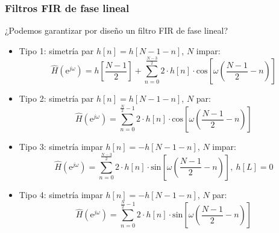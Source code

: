 \documentclass[handout]{beamer}
\numberwithin{section}{part}
\begin{document}
\begin{frame}
  \frametitle{Filtros FIR de fase lineal}
 
  \alert{¿Podemos garantizar por diseño un filtro FIR de fase lineal?}
  
  \begin{itemize}
    \footnotesize %
    \item \alert{Tipo 1}: simetría par $h[n]=h[N-1-n]$, $N$ impar:\\
    \[
    \hat H(\mathrm{e}^{j\omega})=h[\frac{N-1}{2}] + \sum_{n=0}^{\frac{N-3}{2}}2\cdot h[n]\cdot\mathrm{cos}\left[\omega\left(\frac{N-1}{2}-n\right)\right]
    \]
    \item \alert{Tipo 2}: simetría par $h[n]=h[N-1-n]$, $N$ par:
    \[
    \hat H(\mathrm{e}^{j\omega})=\sum_{n=0}^{\frac{N}{2}-1}2\cdot h[n]\cdot\mathrm{cos}\left[\omega\left(\frac{N-1}{2} - n\right)\right]
    \]
    \item \alert{Tipo 3}: simetría impar $h[n]=-h[N-1-n]$, $N$ impar:
    \[
    \hat H(\mathrm{e}^{j\omega})=\sum_{n=0}^{\frac{N-3}{2}}2\cdot h[n]\cdot\mathrm{sin}\left[\omega\left(\frac{N-1}{2} - n\right)\right],~h[L]=0
    \]
    \item \alert{Tipo 4}: simetría impar $h[n]=-h[N-1-n]$, $N$ par:
    \[
    \hat H(\mathrm{e}^{j\omega})=\sum_{n=0}^{\frac{N}{2}-1}2\cdot h[n]\cdot\mathrm{sin}\left[\omega\left(\frac{N-1}{2} - n\right)\right]
    \]
  \end{itemize}
\end{frame}
\end{document}

